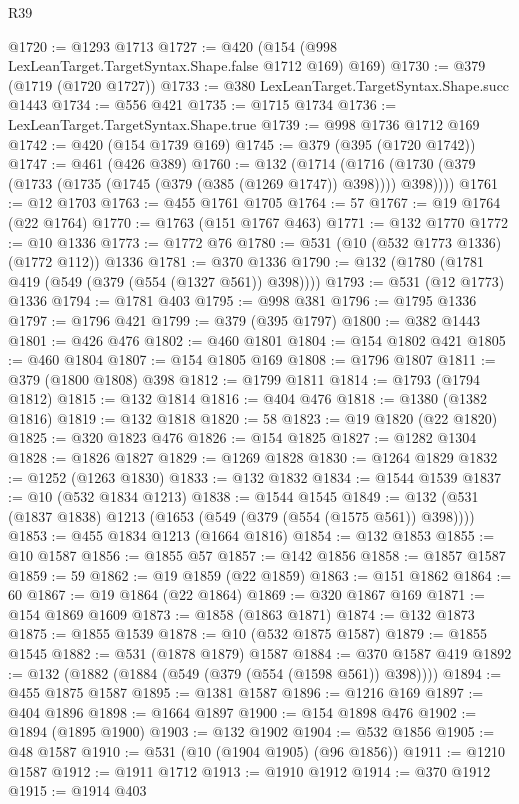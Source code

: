 \begin{lexlean}{R39}
\begin{coremodule}
@1720 := @1293 @1713
@1727 := @420 (@154 (@998 LexLeanTarget.TargetSyntax.Shape.false @1712 @169) @169)
@1730 := @379 (@1719 (@1720 @1727))
@1733 := @380 LexLeanTarget.TargetSyntax.Shape.succ @1443
@1734 := @556 @421
@1735 := @1715 @1734
@1736 := LexLeanTarget.TargetSyntax.Shape.true
@1739 := @998 @1736 @1712 @169
@1742 := @420 (@154 @1739 @169)
@1745 := @379 (@395 (@1720 @1742))
@1747 := @461 (@426 @389)
@1760 := @132
    (@1714 (@1716 (@1730 (@379 (@1733 (@1735 (@1745 (@379 (@385 (@1269 @1747)) @398)))) @398))))
@1761 := @12 @1703
@1763 := @455 @1761 @1705
@1764 := 57
@1767 := @19 @1764 (@22 @1764)
@1770 := @1763 (@151 @1767 @463)
@1771 := @132 @1770
@1772 := @10 @1336
@1773 := @1772 @76
@1780 := @531 (@10 (@532 @1773 @1336) (@1772 @112)) @1336
@1781 := @370 @1336
@1790 := @132 (@1780 (@1781 @419 (@549 (@379 (@554 (@1327 @561)) @398))))
@1793 := @531 (@12 @1773) @1336
@1794 := @1781 @403
@1795 := @998 @381
@1796 := @1795 @1336
@1797 := @1796 @421
@1799 := @379 (@395 @1797)
@1800 := @382 @1443
@1801 := @426 @476
@1802 := @460 @1801
@1804 := @154 @1802 @421
@1805 := @460 @1804
@1807 := @154 @1805 @169
@1808 := @1796 @1807
@1811 := @379 (@1800 @1808) @398
@1812 := @1799 @1811
@1814 := @1793 (@1794 @1812)
@1815 := @132 @1814
@1816 := @404 @476
@1818 := @1380 (@1382 @1816)
@1819 := @132 @1818
@1820 := 58
@1823 := @19 @1820 (@22 @1820)
@1825 := @320 @1823 @476
@1826 := @154 @1825
@1827 := @1282 @1304
@1828 := @1826 @1827
@1829 := @1269 @1828
@1830 := @1264 @1829
@1832 := @1252 (@1263 @1830)
@1833 := @132 @1832
@1834 := @1544 @1539
@1837 := @10 (@532 @1834 @1213)
@1838 := @1544 @1545
@1849 := @132 (@531 (@1837 @1838) @1213 (@1653 (@549 (@379 (@554 (@1575 @561)) @398))))
@1853 := @455 @1834 @1213 (@1664 @1816)
@1854 := @132 @1853
@1855 := @10 @1587
@1856 := @1855 @57
@1857 := @142 @1856
@1858 := @1857 @1587
@1859 := 59
@1862 := @19 @1859 (@22 @1859)
@1863 := @151 @1862
@1864 := 60
@1867 := @19 @1864 (@22 @1864)
@1869 := @320 @1867 @169
@1871 := @154 @1869 @1609
@1873 := @1858 (@1863 @1871)
@1874 := @132 @1873
@1875 := @1855 @1539
@1878 := @10 (@532 @1875 @1587)
@1879 := @1855 @1545
@1882 := @531 (@1878 @1879) @1587
@1884 := @370 @1587 @419
@1892 := @132 (@1882 (@1884 (@549 (@379 (@554 (@1598 @561)) @398))))
@1894 := @455 @1875 @1587
@1895 := @1381 @1587
@1896 := @1216 @169
@1897 := @404 @1896
@1898 := @1664 @1897
@1900 := @154 @1898 @476
@1902 := @1894 (@1895 @1900)
@1903 := @132 @1902
@1904 := @532 @1856
@1905 := @48 @1587
@1910 := @531 (@10 (@1904 @1905) (@96 @1856))
@1911 := @1210 @1587
@1912 := @1911 @1712
@1913 := @1910 @1912
@1914 := @370 @1912
@1915 := @1914 @403

\end{coremodule}
\end{lexlean}
